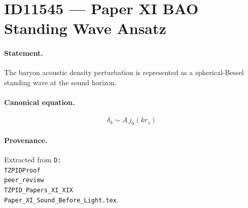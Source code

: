 \section*{ID11545 --- Paper XI BAO Standing Wave Ansatz}

\paragraph{Statement.}
The baryon acoustic density perturbation is represented as a spherical-Bessel standing wave at the sound horizon.

\paragraph{Canonical equation.}
\[
\delta_b\sim A\,j_0(k r_s)
\]

\paragraph{Provenance.}
Extracted from \texttt{D:\\TZPIDProof\\peer\_review\\TZPID\_Papers\_XI\_XIX\\Paper\_XI\_Sound\_Before\_Light.tex}.
